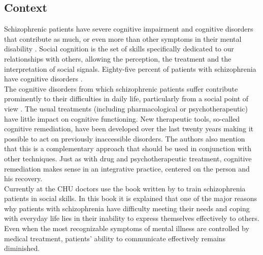 \documentclass[11pt]{article}
\begin{document}
\subsection{Context}
Schizophrenic patients have severe cognitive impairment and cognitive disorders that contribute as much, or even more than other symptoms in their mental disability \citep{Green96}. Social cognition is the set of skills specifically dedicated to our relationships with others, allowing the perception, the treatment and the interpretation of social signals. Eighty-five percent of patients with schizophrenia have cognitive disorders \citep{Vianin03}.\\

The cognitive disorders from which schizophrenic patients suffer contribute prominently to their difficulties in daily life, particularly from a social point of view \citep{Peneau15}. The usual treatments (including pharmacological or psychotherapeutic) have little impact on cognitive functioning. New therapeutic tools, so-called cognitive remediation, have been developed over the last twenty years making it possible to act on previously inaccessible disorders. The authors also mention that this is a complementary approach that should be used in conjunction with other techniques. Just as with drug and psychotherapeutic treatment, cognitive remediation makes sense in an integrative practice, centered on the person and his recovery.\\

Currently at the CHU doctors use the book written by \citeauthor{Liberman05} to train schizophrenia patients in social skills. In this book it is explained that one of the major reasons why patients with schizophrenia have difficulty meeting their needs and coping with everyday life lies in their inability to express themselves effectively to others. Even when the most recognizable symptoms of mental illness are controlled by medical treatment, patients' ability to communicate effectively remains diminished.
\end{document}
